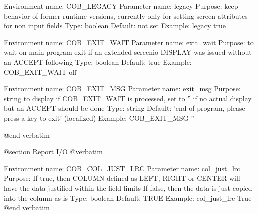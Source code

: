 Environment name:  COB_LEGACY
  Parameter name:  legacy
         Purpose:  keep behavior of former runtime versions, currently only
                   for setting screen attributes for non input fields
            Type:  boolean
         Default:  not set
         Example:  legacy true

Environment name:  COB_EXIT_WAIT
  Parameter name:  exit_wait
         Purpose:  to wait on main program exit if an extended screenio
                   DISPLAY was issued without an ACCEPT following
            Type:  boolean
         Default:  true
         Example:  COB_EXIT_WAIT off

Environment name:  COB_EXIT_MSG
  Parameter name:  exit_msg
         Purpose:  string to display if COB_EXIT_WAIT is processed, set to ''
                   if no actual display but an ACCEPT should be done
            Type:  string
         Default:  'end of program, please press a key to exit' (localized)
         Example:  COB_EXIT_MSG ''


@end verbatim

@section Report I/O
@verbatim


Environment name:  COB_COL_JUST_LRC
  Parameter name:  col_just_lrc
         Purpose:  If true, then COLUMN defined as LEFT, RIGHT or CENTER
                   will have the data justified within the field limits
                   If false, then the data is just copied into the column as is
            Type:  boolean
         Default:  TRUE
         Example:  col_just_lrc True
@end verbatim
